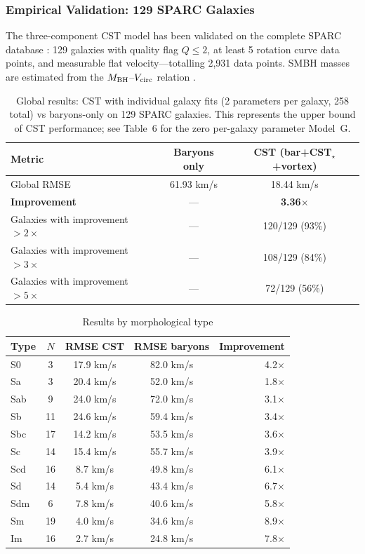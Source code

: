 \documentclass[11pt,a4paper]{article}
\begin{document}
\subsubsection{Empirical Validation: 129 SPARC Galaxies}

The three-component CST model has been validated on the complete SPARC database \cite{Lelli2016}: 129 galaxies with quality flag $Q \leq 2$, at least 5 rotation curve data points, and measurable flat velocity---totalling 2{,}931 data points. SMBH masses are estimated from the $M_{\rm BH}$--$V_{\rm circ}$ relation \cite{Davis2019}.

\begin{table}[h]
\centering
\caption{Global results: CST with individual galaxy fits (2 parameters per galaxy, 258 total) vs baryons-only on 129 SPARC galaxies. This represents the upper bound of CST performance; see Table~6 for the zero per-galaxy parameter Model~G.}
\begin{tabular}{lcc}
\toprule
Metric & Baryons only & CST (bar+CST$_\star$+vortex) \\
\midrule
Global RMSE & 61.93 km/s & 18.44 km/s \\
\textbf{Improvement} & --- & \textbf{3.36$\times$} \\
Galaxies with improvement $>2\times$ & --- & 120/129 (93\%) \\
Galaxies with improvement $>3\times$ & --- & 108/129 (84\%) \\
Galaxies with improvement $>5\times$ & --- & 72/129 (56\%) \\
\bottomrule
\end{tabular}
\end{table}

\begin{table}[h]
\centering
\caption{Results by morphological type}
\begin{tabular}{lcccr}
\toprule
Type & $N$ & RMSE CST & RMSE baryons & Improvement \\
\midrule
S0   & 3  & 17.9 km/s & 82.0 km/s & 4.2$\times$ \\
Sa   & 3  & 20.4 km/s & 52.0 km/s & 1.8$\times$ \\
Sab  & 9  & 24.0 km/s & 72.0 km/s & 3.1$\times$ \\
Sb   & 11 & 24.6 km/s & 59.4 km/s & 3.4$\times$ \\
Sbc  & 17 & 14.2 km/s & 53.5 km/s & 3.6$\times$ \\
Sc   & 14 & 15.4 km/s & 55.7 km/s & 3.9$\times$ \\
Scd  & 16 & 8.7 km/s  & 49.8 km/s & 6.1$\times$ \\
Sd   & 14 & 5.4 km/s  & 43.4 km/s & 6.7$\times$ \\
Sdm  & 6  & 7.8 km/s  & 40.6 km/s & 5.8$\times$ \\
Sm   & 19 & 4.0 km/s  & 34.6 km/s & 8.9$\times$ \\
Im   & 16 & 2.7 km/s  & 24.8 km/s & 7.8$\times$ \\
\bottomrule
\end{tabular}
\end{table}
\end{document}
